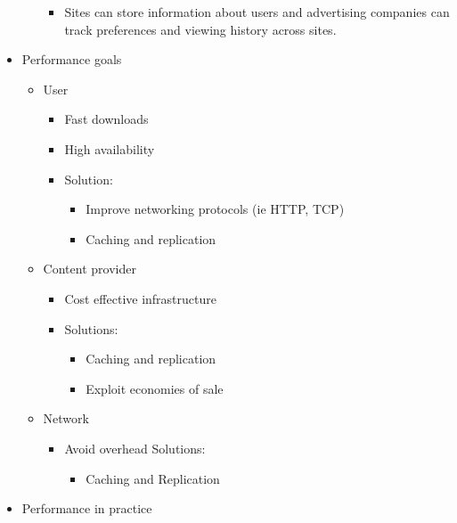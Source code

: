 \begin{itemize}
\begin{itemize}
    \begin{itemize}
    \tightlist
    \item
      Sites can store information about users and advertising companies
      can track preferences and viewing history across sites.
    \end{itemize}
  \end{itemize}
\item
  Performance goals

  \begin{itemize}
  \tightlist
  \item
    User

    \begin{itemize}
    \tightlist
    \item
      Fast downloads
    \item
      High availability
    \item
      Solution:

      \begin{itemize}
      \tightlist
      \item
        Improve networking protocols (ie HTTP, TCP)
      \item
        Caching and replication
      \end{itemize}
    \end{itemize}
  \item
    Content provider

    \begin{itemize}
    \tightlist
    \item
      Cost effective infrastructure
    \item
      Solutions:

      \begin{itemize}
      \tightlist
      \item
        Caching and replication
      \item
        Exploit economies of sale
      \end{itemize}
    \end{itemize}
  \item
    Network

    \begin{itemize}
    \tightlist
    \item
      Avoid overhead Solutions:

      \begin{itemize}
      \tightlist
      \item
        Caching and Replication
      \end{itemize}
    \end{itemize}
  \end{itemize}
\item
  Performance in practice


\end{itemize}
